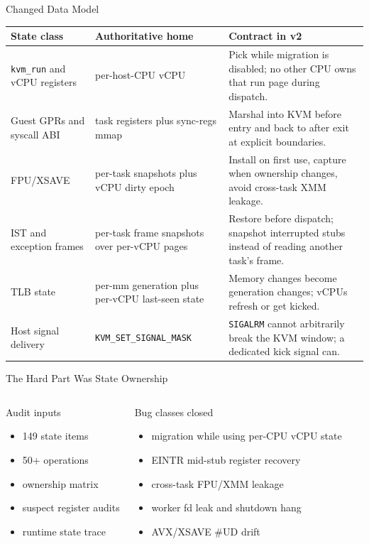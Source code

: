 \documentclass[aspectratio=169,11pt]{beamer}
\begin{document}
\begin{frame}{Changed Data Model}
\scriptsize
\begin{tabularx}{\textwidth}{@{}p{}p{}X@{}}
\toprule
State class & Authoritative home & Contract in v2 \\
\midrule
\texttt{kvm\_run} and vCPU registers & per-host-CPU vCPU & Pick while migration is disabled; no other CPU owns that run page during dispatch. \\
Guest GPRs and syscall ABI & task registers plus sync-regs mmap & Marshal into KVM before entry and back to \UML{} after exit at explicit boundaries. \\
FPU/XSAVE & per-task snapshots plus vCPU dirty epoch & Install on first use, capture when ownership changes, avoid cross-task XMM leakage. \\
IST and exception frames & per-task frame snapshots over per-vCPU pages & Restore before dispatch; snapshot interrupted stubs instead of reading another task's frame. \\
TLB state & per-mm generation plus per-vCPU last-seen state & Memory changes become generation changes; vCPUs refresh or get kicked. \\
Host signal delivery & \texttt{KVM\_SET\_SIGNAL\_MASK} & \texttt{SIGALRM} cannot arbitrarily break the KVM window; a dedicated kick signal can. \\
\bottomrule
\end{tabularx}
\end{frame}

\begin{frame}{The Hard Part Was State Ownership}
\begin{columns}[T,onlytextwidth]
\begin{block}{Audit inputs}
\begin{itemize}
  \item 149 state items
  \item 50+ operations
  \item ownership matrix
  \item suspect register audits
  \item runtime state trace
\end{itemize}
\end{block}
\begin{block}{Bug classes closed}
\begin{itemize}
  \item migration while using per-CPU vCPU state
  \item EINTR mid-stub register recovery
  \item cross-task FPU/XMM leakage
  \item worker fd leak and shutdown hang
  \item AVX/XSAVE \#UD drift
\end{itemize}
\end{block}
\end{columns}
\end{frame}
\end{document}
